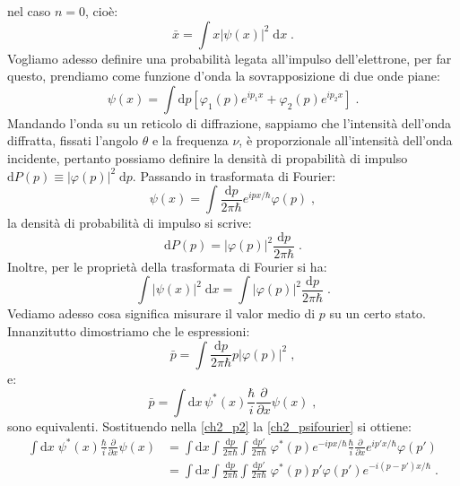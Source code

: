 \documentclass[12pt,a4paper]{report}
\theoremstyle{definition}
\numberwithin{equation}{section}
\newcommand{\diff}[1][]{\mathrm{d}#1}
\begin{document}
nel caso $n=0$, cioè:
\begin{equation}
\bar{x}=\int x|\psi(x)|^2\;\diff{x}\;.
\end{equation}
Vogliamo adesso definire una probabilità legata all'impulso dell'elettrone, per far questo, prendiamo come funzione d'onda la sovrapposizione di due onde piane:
\begin{equation}
\psi(x)=\int \diff{p}[\varphi_1(p)e^{ip_1x}+\varphi_2(p)e^{ip_2x}]\;.
\end{equation}
Mandando l'onda su un reticolo di diffrazione, sappiamo che l'intensità dell'onda diffratta, fissati l'angolo $\theta$ e la frequenza $\nu$, è proporzionale all'intensità dell'onda incidente, pertanto possiamo definire la densità di propabilità di impulso $\diff{P(p)}\equiv|\varphi(p)|^2\;\diff{p}$. Passando in trasformata di Fourier:
\begin{equation}
\psi(x)=\int \frac{\diff{p}}{2\pi\hbar}e^{ipx/\hbar}\varphi(p)\;, \label{ch2_psifourier}
\end{equation}
la densità di probabilità di impulso si scrive:
\begin{equation}
\diff{P(p)}=|\varphi(p)|^2\frac{\diff{p}}{2\pi\hbar}\;.
\end{equation}
Inoltre, per le proprietà della trasformata di Fourier si ha:
\begin{equation}
\int |\psi(x)|^2\;\diff{x}=\int |\varphi(p)|^2\frac{\diff{p}}{2\pi\hbar}\;.
\end{equation}
Vediamo adesso cosa significa misurare il valor medio di $p$ su un certo stato. Innanzitutto dimostriamo che le espressioni:
\begin{equation}
\bar{p}=\int\frac{\diff{p}}{2\pi\hbar}p|\varphi(p)|^2\;, \label{ch2_p1}
\end{equation}
e:
\begin{equation}
\bar{p}=\int\diff{x}\,\psi^*(x)\frac{\hbar}{i}\frac{\partial}{\partial x}\psi(x)\;, \label{ch2_p2}
\end{equation}
sono equivalenti. Sostituendo nella \eqref{ch2_p2} la \eqref{ch2_psifourier} si ottiene:
\begin{align*}
\int \diff{x}\; \psi^*(x)\frac{\hbar}{i}\frac{\partial}{\partial x}\psi(x) &= \int \diff{x}\int \frac{\diff{p}}{2\pi\hbar}\int \frac{\diff{p'}}{2\pi\hbar}\;\varphi^*(p)e^{-ipx/\hbar}\frac{\hbar}{i}\frac{\partial}{\partial x}
e^{ip'x/\hbar}\varphi(p') \\
&= \int \diff{x}\int\frac{\diff{p}}{2\pi\hbar}\int\frac{\diff{p'}}{2\pi\hbar}\;\varphi^*(p)p'\varphi(p')e^{-i(p-p')x/\hbar}\;.
\end{align*}
\end{document}
